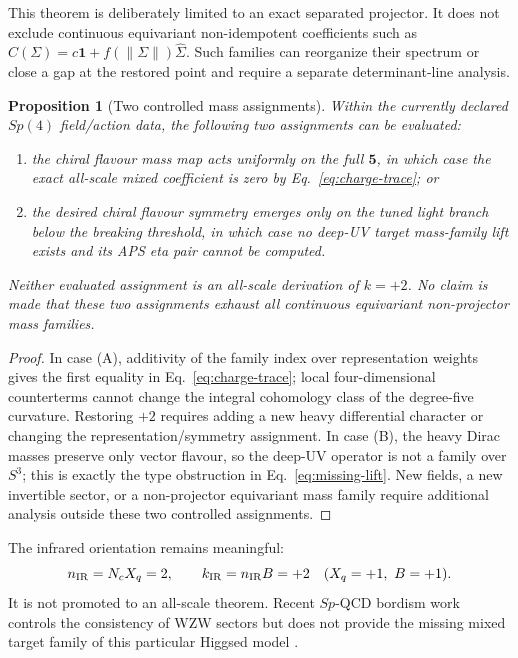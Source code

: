 \documentclass[11pt]{article}
\newtheorem{proposition}[theorem]{Proposition}
\theoremstyle{definition}
\theoremstyle{remark}
\begin{document}
This theorem is deliberately limited to an exact separated projector.  It
does not exclude continuous equivariant non-idempotent coefficients such as
\(C(\Sigma)=c\bm1+f(\lVert\Sigma\rVert)\widehat\Sigma\).  Such families can
reorganize their spectrum or close a gap at the restored point and require a
separate determinant-line analysis.

\begin{proposition}[Two controlled mass assignments]
Within the currently declared \(Sp(4)\) field/action data, the following two
assignments can be evaluated:
\begin{enumerate}[label=(\Alph*)]
\item the chiral flavour mass map acts uniformly on the full \(\bm5\), in
  which case the exact all-scale mixed coefficient is zero by
  Eq.~\eqref{eq:charge-trace}; or
\item the desired chiral flavour symmetry emerges only on the tuned light
  branch below the breaking threshold, in which case no deep-UV target
  mass-family lift exists and its APS eta pair cannot be computed.
\end{enumerate}
Neither evaluated assignment is an all-scale derivation of \(k=+2\).  No
claim is made that these two assignments exhaust all continuous equivariant
non-projector mass families.
\end{proposition}
\begin{proof}
In case (A), additivity of the family index over representation weights gives
the first equality in Eq.~\eqref{eq:charge-trace}; local four-dimensional
counterterms cannot change the integral cohomology class of the degree-five
curvature.  Restoring \(+2\) requires adding a new heavy differential
character or changing the representation/symmetry assignment.  In case
(B), the heavy Dirac masses preserve only vector flavour, so the deep-UV
operator is not a family over \(S^3\); this is exactly the type obstruction
in Eq.~\eqref{eq:missing-lift}.  New fields, a new invertible sector, or a
non-projector equivariant mass family require additional analysis outside
these two controlled assignments.
\end{proof}

The infrared orientation remains meaningful:
\begin{equation}
 n_{\rm IR}=N_cX_q=2,\qquad k_{\rm IR}=n_{\rm IR}B=+2
 \quad(X_q=+1,\ B=+1).
 \label{eq:ir-k}
\end{equation}
It is not promoted to an all-scale theorem.  Recent \(Sp\)-QCD bordism work
controls the consistency of WZW sectors but does not provide the missing
mixed target family of this particular Higgsed model \cite{Saito2024}.
\end{document}

